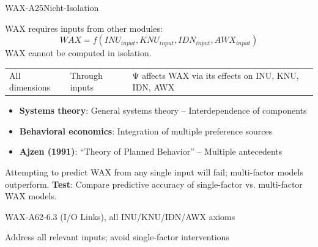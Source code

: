 \begin{axiomspec}{WAX-A25}{Nicht-Isolation}

WAX requires inputs from other modules:
\begin{equation}
WAX = f(INU_{input}, KNU_{input}, IDN_{input}, AWX_{input})
\end{equation}
WAX cannot be computed in isolation.

\begin{tabular}{lll}
All dimensions & Through inputs & Ψ affects WAX via its effects on INU, KNU, IDN, AWX \\
\end{tabular}

\begin{itemize}
\item \textbf{Systems theory}: General systems theory -- Interdependence of components
\item \textbf{Behavioral economics}: Integration of multiple preference sources
\item \textbf{Ajzen (1991)}: ``Theory of Planned Behavior'' -- Multiple antecedents
\end{itemize}

Attempting to predict WAX from any single input will fail; multi-factor models outperform.
\textbf{Test}: Compare predictive accuracy of single-factor vs. multi-factor WAX models.

WAX-A62-6.3 (I/O Links), all INU/KNU/IDN/AWX axioms

Address all relevant inputs; avoid single-factor interventions

\end{axiomspec}


